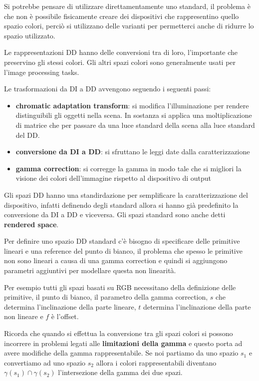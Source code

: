 Si potrebbe pensare di utilizzare direttamentamente uno standard, il problema è 
che non è possibile fisicamente creare dei dispositivi che rappresentino quello spazio 
colori, perciò si utilizzano delle varianti per permetterci anche di ridurre lo spazio
utilizzato.

Le rappresentazioni DD hanno delle conversioni tra di loro, l'importante che preservino 
gli stessi colori. Gli altri spazi colori sono generalmente usati per l'image processing 
tasks.

Le trasformazioni da DI a DD avvengono seguendo i seguenti passi:
\begin{itemize}
    \item \textbf{chromatic adaptation transform}: si modifica l'illuminazione per 
    rendere distinguibili gli oggetti nella scena. In sostanza si applica una 
    moltiplicazione di matrice che per passare da una luce standard della scena 
    alla luce standard del DD.
    \item \textbf{conversione da DI a DD}: si sfruttano le leggi date dalla caratterizzazione
    \item \textbf{gamma correction}: si corregge la gamma in modo tale che si migliori 
    la visione dei colori dell'immagine rispetto al dispositivo di output
\end{itemize}

Gli spazi DD hanno una standirdazione per semplificare la caratterizzazione del
dispositivo, infatti definendo degli standard allora si hanno già predefinito la 
conversione da DI a DD e viceversa. Gli spazi standard sono anche detti \textbf{rendered space}.

Per definire uno spazio DD standard c'è bisogno di specificare delle primitive 
lineari e una reference del punto di bianco, il problema che spesso le primitive 
non sono lineari a causa di una gamma correction e quindi si aggiungono parametri 
aggiuntivi per modellare questa non linearità.

\begin{nota}
    Per esempio tutti gli spazi basati su RGB necessitano della definizione delle 
    primitive, il punto di bianco, il parametro della gamma correction, $s$ che 
    determina l'inclinazione della parte lineare, $t$  determina l'inclinazione della parte non lineare
    e $f$ è l'offset.
\end{nota}

Ricorda che quando si effettua la conversione tra gli spazi colori si possono incorrere 
in problemi legati alle \textbf{limitazioni della gamma} e questo porta ad avere 
modifiche della gamma rappresentabile. Se noi partiamo da uno spazio $s_1$ e convertiamo 
ad uno spazio $s_2$ allora i colori rappresentabili diventano $\gamma(s_1)\cap \gamma(s_2)$ 
l'intersezione della gamma dei due spazi.

